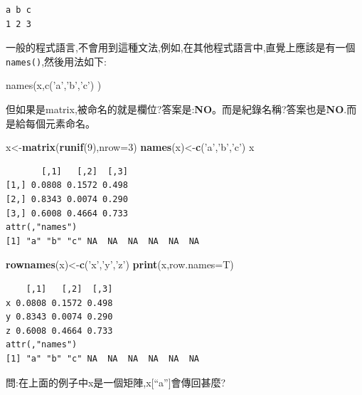 \documentclass[]{book}
\newenvironment{Shaded}{\begin{snugshade}}{\end{snugshade}}
\newcommand{\CharTok}[1]{\textcolor[rgb]{0.31,0.60,0.02}{#1}}
\newcommand{\DataTypeTok}[1]{\textcolor[rgb]{0.13,0.29,0.53}{#1}}
\newcommand{\DecValTok}[1]{\textcolor[rgb]{0.00,0.00,0.81}{#1}}
\newcommand{\KeywordTok}[1]{\textcolor[rgb]{0.13,0.29,0.53}{\textbf{#1}}}
\newcommand{\NormalTok}[1]{#1}
\newcommand{\StringTok}[1]{\textcolor[rgb]{0.31,0.60,0.02}{#1}}
\theoremstyle{definition}
\theoremstyle{definition}
\theoremstyle{definition}
\theoremstyle{remark}
\begin{document}
\begin{verbatim}
a b c 
1 2 3 
\end{verbatim}

一般的程式語言,不會用到這種文法,例如,在其他程式語言中,直覺上應該是有一個\texttt{names()},然後用法如下:

\begin{Shaded}
\begin{Highlighting}[]
\NormalTok{names(x,c(}\CharTok{'a'}\NormalTok{,}\CharTok{'b'}\NormalTok{,}\CharTok{'c'}\NormalTok{) )}
\end{Highlighting}
\end{Shaded}

但如果是matrix,被命名的就是欄位?答案是:\textbf{NO}。而是紀錄名稱?答案也是\textbf{NO}.而是給每個元素命名。

\begin{Shaded}
\begin{Highlighting}[]
\NormalTok{x<-}\KeywordTok{matrix}\NormalTok{(}\KeywordTok{runif}\NormalTok{(}\DecValTok{9}\NormalTok{),}\DataTypeTok{nrow=}\DecValTok{3}\NormalTok{)}
\KeywordTok{names}\NormalTok{(x)<-}\KeywordTok{c}\NormalTok{(}\StringTok{'a'}\NormalTok{,}\StringTok{'b'}\NormalTok{,}\StringTok{'c'}\NormalTok{)}
\NormalTok{x}
\end{Highlighting}
\end{Shaded}

\begin{verbatim}
       [,1]   [,2]  [,3]
[1,] 0.0808 0.1572 0.498
[2,] 0.8343 0.0074 0.290
[3,] 0.6008 0.4664 0.733
attr(,"names")
[1] "a" "b" "c" NA  NA  NA  NA  NA  NA 
\end{verbatim}

\begin{Shaded}
\begin{Highlighting}[]
\KeywordTok{rownames}\NormalTok{(x)<-}\KeywordTok{c}\NormalTok{(}\StringTok{'x'}\NormalTok{,}\StringTok{'y'}\NormalTok{,}\StringTok{'z'}\NormalTok{)}
\KeywordTok{print}\NormalTok{(x,}\DataTypeTok{row.names=}\NormalTok{T)}
\end{Highlighting}
\end{Shaded}

\begin{verbatim}
    [,1]   [,2]  [,3]
x 0.0808 0.1572 0.498
y 0.8343 0.0074 0.290
z 0.6008 0.4664 0.733
attr(,"names")
[1] "a" "b" "c" NA  NA  NA  NA  NA  NA 
\end{verbatim}

問:在上面的例子中x是一個矩陣,x{[}``a''{]}會傳回甚麼?
\end{document}
